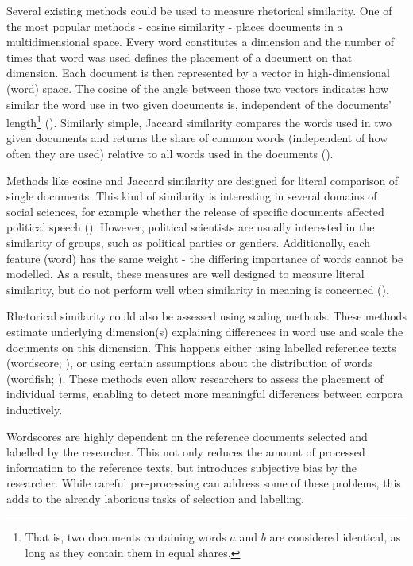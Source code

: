 \documentclass{article}
\begin{document}
Several existing methods could be used to measure rhetorical similarity. One of the most popular methods - cosine similarity - places documents in a multidimensional space. Every word constitutes a dimension and the number of times that word was used defines the placement of a document on that dimension. Each document is then represented by a vector in high-dimensional (word) space. The cosine of the angle between those two vectors indicates how similar the word use in two given documents is, independent of the documents' length\footnote{That is, two documents containing words $a$ and $b$ are considered identical, as long as they contain them in equal shares.} (\cite{Similarity2007a}).  Similarly simple, Jaccard similarity compares the words used in two given documents and returns the share of common words (independent of how often they are used) relative to all words used in the documents (\cite{Jaccard1912}).\par

Methods like cosine and Jaccard similarity are designed for literal comparison of single documents. This kind of similarity is interesting in several domains of social sciences, for example whether the release of specific documents affected political speech (\cite{Similarity2007a, Hager2020}). However, political scientists are usually interested in the similarity of groups, such as political parties or genders. Additionally, each feature (word) has the same weight - the differing importance of words cannot be modelled. As a result, these measures are well designed to measure literal similarity, but do not perform well when similarity in meaning is concerned (\cite{Prasetya2018}).\par

Rhetorical similarity could also be assessed using scaling methods. These methods estimate underlying dimension(s) explaining differences in word use and scale the documents on this dimension. This happens either using labelled reference texts (wordscore; \cite{Laver2003}), or using certain assumptions about the distribution of words (wordfish; \cite{Slapin2008}). These methods even allow researchers to assess the placement of individual terms, enabling to detect more meaningful differences between corpora inductively. \par

Wordscores are highly dependent on the reference documents selected and labelled by the researcher. This not only reduces the amount of processed information to the reference texts, but introduces subjective bias by the researcher. While careful pre-processing can address some of these problems, this adds to the already laborious tasks of selection and labelling.\par
\end{document}
